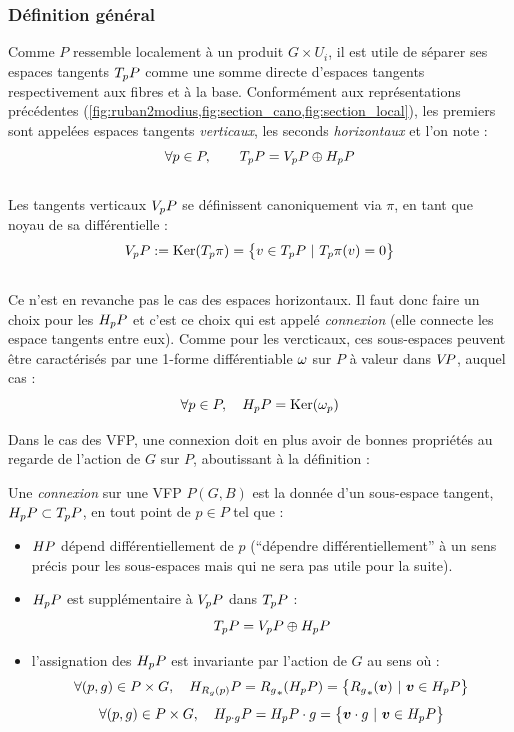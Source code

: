 \subsubsection{Définition général}\label{subsec:def2conn}

Comme $P$ ressemble localement à un produit $G\times U_i$, il est utile de séparer ses espaces tangents $\tg[p]{P}$ comme une somme directe d'espaces tangents respectivement aux fibres et à la base. Conformément aux représentations précédentes (\cref{fig:ruban2modius,fig:section_cano,fig:section_local}), les premiers sont appelées espaces tangents \emph{verticaux}, les seconds \emph{horizontaux} et l'on note :
\[\forall p\in P,\qquad \tg[p]{P} = \vg[p]{P} \oplus \hg[p]{P}\]
\\
Les tangents verticaux $\vg[p]{P}$ se définissent canoniquement via $\pi$, en tant que noyau de sa différentielle :
\[\vg[p]{P} \defeq \Ker (\tg[p]{\pi}) = \big\{ v\in\tg[p]{P}\ |\ \tg[p]{\pi}(v)=0 \big\}\]
\\ 
Ce n'est en revanche pas le cas des espaces horizontaux. Il faut donc faire un choix pour les $\hg[p]{P}$ et c'est ce choix qui est appelé \emph{connexion} (elle connecte les espace tangents entre eux).
Comme pour les vercticaux, ces sous-espaces peuvent être caractérisés par une 1-forme différentiable $\conn$ sur $P$ à valeur dans $\vg{P}$, auquel cas :
\[\forall p\in P,\quad \hg[p]{P} = \Ker(\conn_p)\]
\skipl

Dans le cas des VFP, une connexion doit en plus avoir de bonnes propriétés au regarde de l'action de $G$ sur $P$, aboutissant à la définition :

\begin{definition} \label{def:connexion2VFP}
	Une \emph{connexion} sur une VFP $P(G,B)$ est la donnée d'un sous-espace tangent, $\hg[p]{P}\subset \tg[p]{P}$, en tout point de $p\in P$ tel que :
	\begin{itemize}
		
		\item $\hg{P}$ dépend différentiellement de $p$ (``dépendre différentiellement'' à un sens précis pour les sous-espaces mais qui ne sera pas utile pour la suite).
		
		\item $\hg[p]{P}$ est supplémentaire à $\vg[p]{P}$ dans $\tg[p]{P}$ :
		\begin{equation}\label{eq:TP=V+H}
			\tg[p]{P} = \vg[p]{P} \oplus \hg[p]{P}
		\end{equation}
		
		\item l'assignation des $\hg[p]{P}$ est invariante par l'action de $G$ au sens où :
		\begin{equation}\label{eq:conn_G-inv}
			\forall (p,g)\in P\times G,\quad \hg[R_g(p)]{P} = {R_g}_* (\hg[p]{P}) = \big\{{R_g}_*(\bf{v})\ |\ \bf{v} \in \hg[p]{P} \big\}
		\end{equation}
		\begin{equation}
		\forall (p,g)\in P\times G,\quad \hg[p\cdot g]{P} = \hg[p]{P}\cdot g = \big\{\bf{v}\cdot g\ |\ \bf{v} \in \hg[p]{P} \big\}
		\end{equation}
	\end{itemize}
\end{definition}
\skipl


